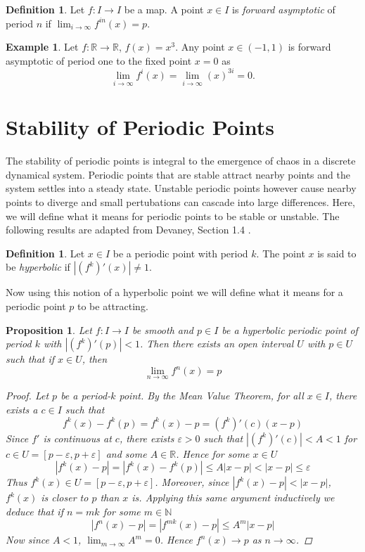 \documentclass[11pt,a4paper,oneside]{memoir}
\theoremstyle{plain}
\newtheorem{prop}[thm]{Proposition}
\theoremstyle{definition}
\newtheorem{defn}[thm]{Definition}
\newtheorem{exmp}[thm]{Example}
\begin{document}
\begin{defn}
    Let $f: I \to I$ be a map. A point $x \in I$ is \emph{forward asymptotic} of period $n$ if $\lim_{i \to \infty} f^{in}(x) = p$.
\end{defn}

\begin{exmp}
    Let $f: \mathbb{R} \to \mathbb{R}$, $f(x) = x^3$. Any point $x \in (-1, 1)$ is forward asymptotic of period one to the fixed point $x = 0$ as \[\lim_{i \to \infty} f^{i} \left(x\right)  = \lim_{i \to \infty} \left(x\right) ^{3i} = 0.\]
\end{exmp}

\section{Stability of Periodic Points}
The stability of periodic points is integral to the emergence of chaos in a discrete dynamical system. Periodic points that are stable attract nearby points and the system settles into a steady state. Unstable periodic points however cause nearby points to diverge and small pertubations can cascade into large differences. Here, we will define what it means for periodic points to be stable or unstable. The following results are adapted from Devaney, Section 1.4 \cite{devaney}.

\begin{defn}
    Let $x \in I$ be a periodic point with period $k$. The point $x$ is said to be \emph{hyperbolic} if $|(f^k)'(x)| \neq 1$.
\end{defn}

Now using this notion of a hyperbolic point we will define what it means for a periodic point $p$ to be attracting.

\begin{prop} \label{prop:attractor}
    Let $f: I \to I$ be smooth and $p \in I$ be a hyperbolic periodic point of period $k$ with $|(f^k)'(p)| < 1$. Then there exists an open interval $U$ with $p \in U$ such that if $x \in U$, then \[ \lim_{n \to \infty} f^n(x) = p \]

    \begin{proof}
        Let $p$ be a period-$k$ point. By the Mean Value Theorem, for all $x \in I$, there exists a $c \in I$ such that \[f^k(x) - f^k(p) = f^k(x) - p = (f^k)'(c)(x-p)\] Since $f'$ is continuous at $c$, there exists $\varepsilon > 0$ such that $|(f^k)'(c)| < A < 1$ for $c \in U = [p - \varepsilon, p + \varepsilon]$ and some $A \in \mathbb{R}$. Hence for some $x \in U$ \[|f^k(x) - p| = |f^k(x) - f^k(p)| \leq A|x-p| < |x-p| \leq \varepsilon\] Thus $f^k(x) \in U = [p - \varepsilon, p + \varepsilon]$. Moreover, since $|f^k(x) - p| < |x - p|$, $f^k(x)$ is closer to $p$ than $x$ is. Applying this same argument inductively we deduce that if $n = mk$ for some $m \in \mathbb{N}$ \[|f^n(x) - p| = |f^{mk}(x) - p| \leq A^m|x - p|\] Now since $A < 1$, $\lim_{m \to \infty}A^m = 0$. Hence $f^n(x) \to p$ as $n \to \infty$. 
    \end{proof}
\end{prop}
\end{document}
